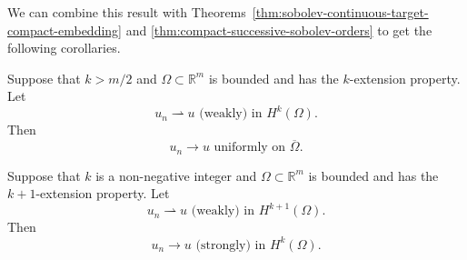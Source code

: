 We can combine this result with Theorems~\ref{thm:sobolev-continuous-target-compact-embedding} and \ref{thm:compact-successive-sobolev-orders} to get the following corollaries.

\begin{Corollary}
\label{cor:compact-sobolev-weak-to-uniform}
Suppose that $k>m/2$ and $\Omega\subset\mathbb{R}^m$ is bounded and has the $k$-extension property. Let
\begin{equation}\label{eq:compact-sobolev-weak-to-uniform-hypothesis}
u_n\rightharpoonup u\text{ (weakly) in }H^k(\Omega).
\end{equation}
Then
\begin{equation}\label{eq:compact-sobolev-weak-to-uniform-conclusion}
u_n\to u\text{ uniformly on }\overline\Omega.
\end{equation}

\end{Corollary}

\begin{Corollary}
\label{cor:compact-sobolev-weak-to-lower-strong}
Suppose that $k$ is a non-negative integer and $\Omega\subset\mathbb{R}^m$ is bounded and has the $k+1$-extension property. Let
\begin{equation}\label{eq:compact-sobolev-successive-order-weak-hypothesis}
u_n\rightharpoonup u\text{ (weakly) in }H^{k+1}(\Omega).
\end{equation}
Then
\begin{equation}\label{eq:compact-sobolev-successive-order-strong-conclusion}
u_n\to u\text{ (strongly) in }H^k(\Omega).
\end{equation}

\end{Corollary}
